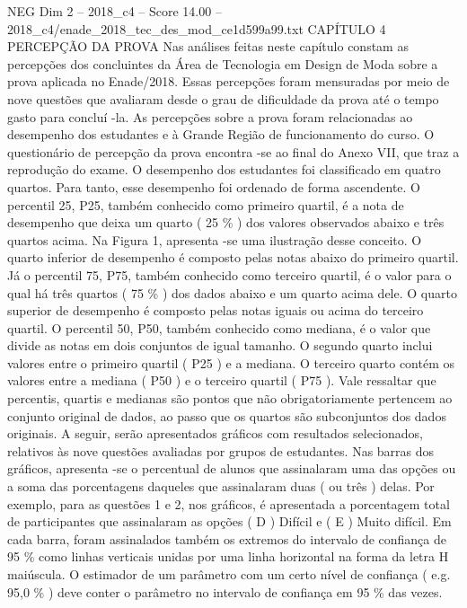 \begin{textsample}{NEG Dim 2 – 2018\_c4 – Score 14.00 – 2018\_c4/enade\_2018\_tec\_des\_mod\_ce1d599a99.txt}  \label{ex:f2_neg_377}
CAPÍTULO 4 PERCEPÇÃO DA PROVA Nas análises feitas neste capítulo constam as percepções dos concluintes da Área de Tecnologia em Design de Moda sobre a prova aplicada no Enade/2018.
Essas percepções foram mensuradas por meio de nove questões que avaliaram desde o grau de dificuldade da prova até o tempo gasto para concluí -la.
As percepções sobre a prova foram relacionadas ao desempenho dos estudantes e à Grande Região de funcionamento do curso.
O questionário de percepção da prova encontra -se ao final do Anexo VII, que traz a reprodução do exame.
O desempenho dos estudantes foi classificado em quatro quartos.
Para tanto, esse desempenho foi ordenado de forma ascendente.
O percentil 25, P25, também conhecido como primeiro quartil, é a nota de desempenho que deixa um quarto ( 25 \% ) dos valores observados abaixo e três quartos acima.
Na Figura 1, apresenta -se uma ilustração desse conceito.
O quarto inferior de desempenho é composto pelas notas abaixo do primeiro quartil.
Já o percentil 75, P75, também conhecido como terceiro quartil, é o valor para o qual há três quartos ( 75 \% ) dos dados abaixo e um quarto acima dele.
O quarto superior de desempenho é composto pelas notas iguais ou acima do terceiro quartil.
O percentil 50, P50, também conhecido como mediana, é o valor que divide as notas em dois conjuntos de igual tamanho.
O segundo quarto inclui valores entre o primeiro quartil ( P25 ) e a mediana.
O terceiro quarto contém os valores entre a mediana ( P50 ) e o terceiro quartil ( P75 ).
Vale ressaltar que percentis, quartis e medianas são pontos que não obrigatoriamente pertencem ao conjunto original de dados, ao passo que os quartos são subconjuntos dos dados originais.
A seguir, serão apresentados gráficos com resultados selecionados, relativos às nove questões avaliadas por grupos de estudantes.
Nas barras dos gráficos, apresenta -se o percentual de alunos que assinalaram uma das opções ou a soma das porcentagens daqueles que assinalaram duas ( ou três ) delas.
Por exemplo, para as questões 1 e 2, nos gráficos, é apresentada a porcentagem total de participantes que assinalaram as opções ( D ) Difícil e ( E ) Muito difícil.
Em cada barra, foram assinalados também os extremos do intervalo de confiança de 95 \% como linhas verticais unidas por uma linha horizontal na forma da letra H maiúscula.
O estimador de um parâmetro com um certo nível de confiança ( e.g. 95,0 \% ) deve conter o parâmetro no intervalo de confiança em 95 \% das vezes.

\end{textsample}
